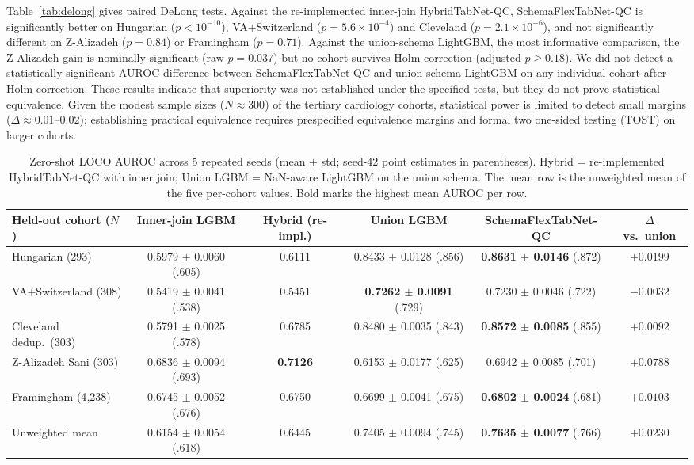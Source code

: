 \documentclass[journal]{IEEEtran}
\newcommand{\sfn}{SchemaFlexTabNet-QC}
\newcommand{\htn}{HybridTabNet-QC}
\begin{document}
Table~\ref{tab:delong} gives paired DeLong tests. Against the re-implemented inner-join \htn{}, \sfn{} is significantly better on Hungarian ($p<10^{-10}$), VA+Switzerland ($p{=}5.6\times10^{-4}$) and Cleveland ($p{=}2.1\times10^{-6}$), and not significantly different on Z-Alizadeh ($p{=}0.84$) or Framingham ($p{=}0.71$). Against the union-schema LightGBM, the most informative comparison, the Z-Alizadeh gain is nominally significant (raw $p{=}0.037$) but no cohort survives Holm correction (adjusted $p\ge 0.18$). We did not detect a statistically significant AUROC difference between \sfn{} and union-schema LightGBM on any individual cohort after Holm correction. These results indicate that superiority was not established under the specified tests, but they do not prove statistical equivalence. Given the modest sample sizes ($N\approx 300$) of the tertiary cardiology cohorts, statistical power is limited to detect small margins ($\Delta\approx 0.01$--$0.02$); establishing practical equivalence requires prespecified equivalence margins and formal two one-sided testing (TOST) on larger cohorts.

\begin{table}[t]
\caption{Zero-shot LOCO AUROC across 5 repeated seeds (mean $\pm$ std; seed-42 point estimates in parentheses). Hybrid = re-implemented \htn{} with inner join; Union LGBM = NaN-aware LightGBM on the union schema. The mean row is the unweighted mean of the five per-cohort values. Bold marks the highest mean AUROC per row.}
\label{tab:loco}
\centering\footnotesize
\begin{tabular}{lccccc}
\toprule
Held-out cohort ($N$) & Inner-join LGBM & Hybrid (re-impl.) & Union LGBM & \sfn{} & $\Delta$ vs.\ union\\
\midrule
Hungarian (293) & 0.5979 $\pm$ 0.0060 (.605) & 0.6111 & 0.8433 $\pm$ 0.0128 (.856) & \textbf{0.8631 $\pm$ 0.0146} (.872) & $+0.0199$\\
VA+Switzerland (308) & 0.5419 $\pm$ 0.0041 (.538) & 0.5451 & \textbf{0.7262 $\pm$ 0.0091} (.729) & 0.7230 $\pm$ 0.0046 (.722) & $-0.0032$\\
Cleveland dedup.\ (303) & 0.5791 $\pm$ 0.0025 (.578) & 0.6785 & 0.8480 $\pm$ 0.0035 (.843) & \textbf{0.8572 $\pm$ 0.0085} (.855) & $+0.0092$\\
Z-Alizadeh Sani (303) & 0.6836 $\pm$ 0.0094 (.693) & \textbf{0.7126} & 0.6153 $\pm$ 0.0177 (.625) & 0.6942 $\pm$ 0.0085 (.701) & $+0.0788$\\
Framingham (4{,}238) & 0.6745 $\pm$ 0.0052 (.676) & 0.6750 & 0.6699 $\pm$ 0.0041 (.675) & \textbf{0.6802 $\pm$ 0.0024} (.681) & $+0.0103$\\
\midrule
Unweighted mean & 0.6154 $\pm$ 0.0054 (.618) & 0.6445 & 0.7405 $\pm$ 0.0094 (.745) & \textbf{0.7635 $\pm$ 0.0077} (.766) & $+0.0230$\\
\bottomrule
\end{tabular}
\end{table}
\end{document}
